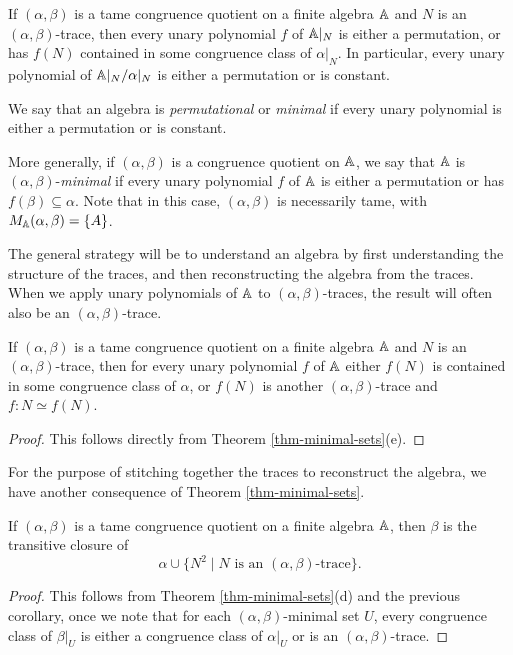 \begin{appendices}
\begin{cor}\label{cor-trace-permutational} If $(\alpha,\beta)$ is a tame congruence quotient on a finite algebra $\mathbb{A}$ and $N$ is an $(\alpha,\beta)$-trace, then every unary polynomial $f$ of $\mathbb{A}|_N$ is either a permutation, or has $f(N)$ contained in some congruence class of $\alpha|_N$. In particular, every unary polynomial of $\mathbb{A}|_N/\alpha|_N$ is either a permutation or is constant.
\end{cor}

\begin{defn} We say that an algebra is \emph{permutational} or \emph{minimal} if every unary polynomial is either a permutation or is constant.

More generally, if $(\alpha,\beta)$ is a congruence quotient on $\mathbb{A}$, we say that $\mathbb{A}$ is $(\alpha,\beta)$-\emph{minimal} if every unary polynomial $f$ of $\mathbb{A}$ is either a permutation or has $f(\beta) \subseteq \alpha$. Note that in this case, $(\alpha,\beta)$ is necessarily tame, with $M_{\mathbb{A}}(\alpha,\beta) = \{A\}$.
\end{defn}

The general strategy will be to understand an algebra by first understanding the structure of the traces, and then reconstructing the algebra from the traces. When we apply unary polynomials of $\mathbb{A}$ to $(\alpha,\beta)$-traces, the result will often also be an $(\alpha,\beta)$-trace.

\begin{cor}\label{cor-trace-iso} If $(\alpha,\beta)$ is a tame congruence quotient on a finite algebra $\mathbb{A}$ and $N$ is an $(\alpha,\beta)$-trace, then for every unary polynomial $f$ of $\mathbb{A}$ either $f(N)$ is contained in some congruence class of $\alpha$, or $f(N)$ is another $(\alpha,\beta)$-trace and $f : N \simeq f(N)$.
\end{cor}
\begin{proof} This follows directly from Theorem \ref{thm-minimal-sets}(e).
\end{proof}

For the purpose of stitching together the traces to reconstruct the algebra, we have another consequence of Theorem \ref{thm-minimal-sets}.

\begin{cor}\label{cor-trace-closure} If $(\alpha,\beta)$ is a tame congruence quotient on a finite algebra $\mathbb{A}$, then $\beta$ is the transitive closure of
\[
\alpha \cup \{N^2 \mid N \text{ is an }(\alpha,\beta)\text{-trace}\}.
\]
\end{cor}
\begin{proof} This follows from Theorem \ref{thm-minimal-sets}(d) and the previous corollary, once we note that for each $(\alpha,\beta)$-minimal set $U$, every congruence class of $\beta|_U$ is either a congruence class of $\alpha|_U$ or is an $(\alpha,\beta)$-trace.
\end{proof}


\end{appendices}
